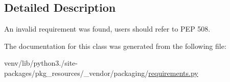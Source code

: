 \subsection{Detailed Description}
\begin{DoxyVerb}An invalid requirement was found, users should refer to PEP 508.
\end{DoxyVerb}
 

The documentation for this class was generated from the following file\+:\begin{DoxyCompactItemize}
\item 
venv/lib/python3./site-\/packages/pkg\+\_\+resources/\+\_\+vendor/packaging/\hyperlink{pkg__resources_2__vendor_2packaging_2requirements_8py}{requirements.\+py}\end{DoxyCompactItemize}

